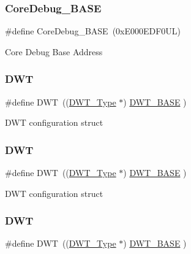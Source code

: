 \subsubsection{\texorpdfstring{Core\+Debug\+\_\+\+B\+A\+SE}{CoreDebug\_BASE}\hspace{0.1cm}{\footnotesize\ttfamily [4/4]}}
{\footnotesize\ttfamily \#define Core\+Debug\+\_\+\+B\+A\+SE~(0x\+E000\+E\+D\+F0\+U\+L)}

Core Debug Base Address \mbox{\label{group___c_m_s_i_s__core__base_gabbe5a060185e1d5afa3f85b14e10a6ce}} 
\subsubsection{\texorpdfstring{D\+WT}{DWT}\hspace{0.1cm}{\footnotesize\ttfamily [1/4]}}
{\footnotesize\ttfamily \#define D\+WT~((\mbox{\hyperlink{struct_d_w_t___type}{D\+W\+T\+\_\+\+Type}}       $\ast$)     \mbox{\hyperlink{group___c_m_s_i_s__core__base_gafdab534f961bf8935eb456cb7700dcd2}{D\+W\+T\+\_\+\+B\+A\+SE}}      )}

D\+WT configuration struct \mbox{\label{group___c_m_s_i_s__core__base_gabbe5a060185e1d5afa3f85b14e10a6ce}} 
\subsubsection{\texorpdfstring{D\+WT}{DWT}\hspace{0.1cm}{\footnotesize\ttfamily [2/4]}}
{\footnotesize\ttfamily \#define D\+WT~((\mbox{\hyperlink{struct_d_w_t___type}{D\+W\+T\+\_\+\+Type}}       $\ast$)     \mbox{\hyperlink{group___c_m_s_i_s__core__base_gafdab534f961bf8935eb456cb7700dcd2}{D\+W\+T\+\_\+\+B\+A\+SE}}      )}

D\+WT configuration struct \mbox{\label{group___c_m_s_i_s__core__base_gabbe5a060185e1d5afa3f85b14e10a6ce}} 
\subsubsection{\texorpdfstring{D\+WT}{DWT}\hspace{0.1cm}{\footnotesize\ttfamily [3/4]}}
{\footnotesize\ttfamily \#define D\+WT~((\mbox{\hyperlink{struct_d_w_t___type}{D\+W\+T\+\_\+\+Type}}       $\ast$)     \mbox{\hyperlink{group___c_m_s_i_s__core__base_gafdab534f961bf8935eb456cb7700dcd2}{D\+W\+T\+\_\+\+B\+A\+SE}}      )}

